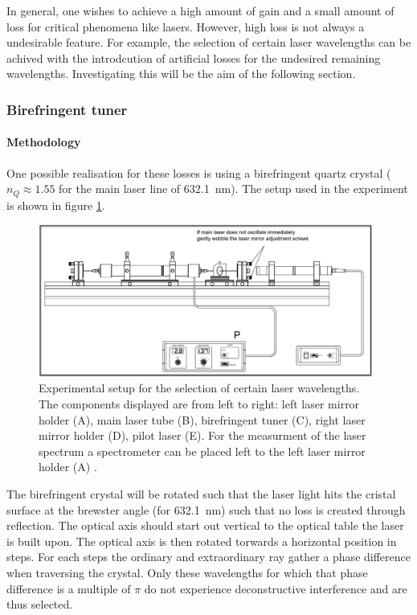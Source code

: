 \documentclass[../main.tex]{subfiles}
\begin{document}
In general, one wishes to achieve a high amount of gain and a small amount of loss for critical phenomena like lasers. However, high loss is not always a undesirable feature. For example, the selection of certain laser wavelengths can be achived with the introdcution of artificial losses for the undesired remaining wavelengths. Investigating this will be the aim of the following section.

\subsubsection{Birefringent tuner}
    \paragraph{Methodology}
        One possible realisation for these losses is using a birefringent quartz crystal ($n_Q \approx\num{1.55}$ for the main laser line of \SI{632.1}{nm}). The setup used in the experiment is shown in figure \ref{fig:5-Aufbau}.

        \begin{figure}[H]
            \centering 
            \includegraphics[width = 11cm]{Bilddateien/5/5-Aufbau.jpg}
            \caption{ Experimental setup for the selection of certain laser wavelengths. The components displayed are from left to right: left laser mirror holder (A), main laser tube (B), birefringent tuner (C), right laser mirror holder (D), pilot laser (E). For the measurment of the laser spectrum a spectrometer can be placed left to the left laser mirror holder (A) \cite[p.22]{doc:HeNeStudentManual}.}
            \label{fig:5-Aufbau}
        \end{figure}

        \noindent The birefringent crystal will be rotated such that the laser light hits the cristal surface at the brewster angle (for \SI{632.1}{nm}) such that no loss is created through reflection. The optical axis should start out vertical to the optical table the laser is built upon. The optical axis is then rotated torwards a horizontal position in steps. For each steps the ordinary and extraordinary ray gather a phase difference when traversing the crystal. Only these wavelengths for which that phase difference is a multiple of $\pi$ do not experience deconstructive interference and are thus selected.
\end{document}
